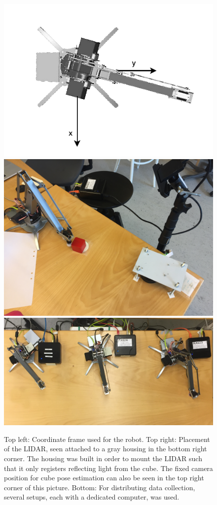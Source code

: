 \begin{figure}[h]
    \centering
    \includegraphics[width=0.50 \textwidth]{res/uarm_coordinates.pdf}
    \includegraphics[width=0.49 \textwidth]{res/camera_placement_fixed.jpg}
    \includegraphics[width=1.00 \textwidth]{res/uarm_moving_setup.png}

    \caption{Top left: Coordinate frame used for the robot. Top right:
    Placement of the LIDAR, seen attached to a gray housing in the bottom right
    corner. The housing was built in order to mount the LIDAR such that it only
    registers reflecting light from the cube. The fixed camera position for
    cube pose estimation can also be seen in the top right corner of this picture.
    Bottom: For distributing data collection, several setups, each with a
    dedicated computer, was used.}

    \label{fig:workspace_lidar_place}

\end{figure}

